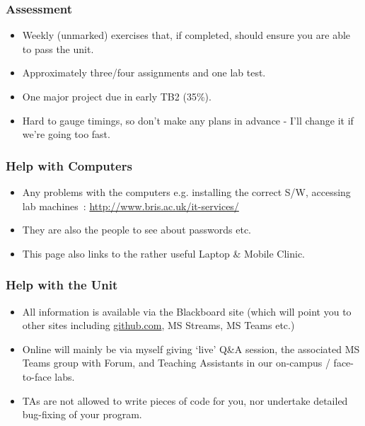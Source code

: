 \begin{frame}%
\frametitle{Assessment}
\begin{itemize}[<+->]
\item Weekly (unmarked) exercises that, if completed, should ensure you are able to pass the unit.
\item Approximately three/four assignments and one lab test.
\item One major project due in early TB2 (35\%).
\item Hard to gauge timings, so don't make any plans in advance -
I'll change it if we're going too fast.
\end{itemize}
\end{frame}


\begin{frame}%
\frametitle{Help with Computers}
\begin{itemize}[<+->]
\item Any problems with the computers e.g. installing the correct S/W, accessing lab machines~: \url{http://www.bris.ac.uk/it-services/}
\item They are also the people to see about passwords etc.
\item This page also links to the rather useful Laptop \& Mobile Clinic.
\end{itemize}
\end{frame}

\begin{frame}%
\frametitle{Help with the Unit}
\begin{itemize}[<+->]
\item All information is available via the Blackboard site (which will point you to other sites including \url{github.com}, MS Streams, MS Teams etc.)
\item Online will mainly be via myself giving `live' Q\&A session, the associated MS Teams group with Forum, and Teaching Assistants in our on-campus / face-to-face labs.
\item TAs are not allowed to write pieces of code for you,
nor undertake detailed bug-fixing of your program.
\end{itemize}
\end{frame}
